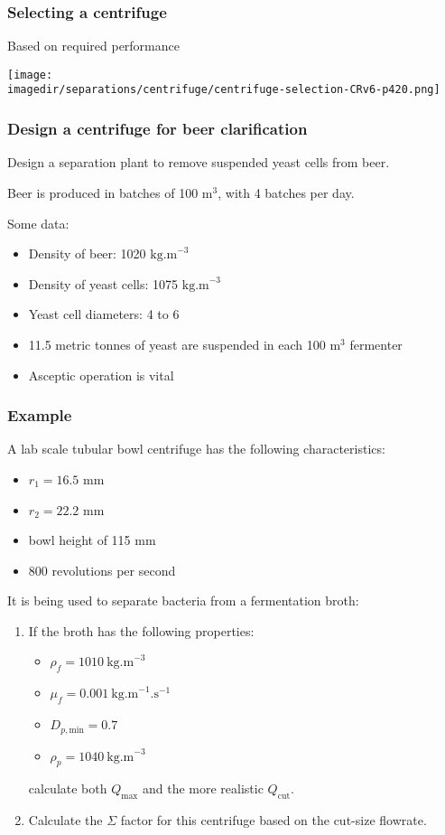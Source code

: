 \begin{frame}\frametitle{Selecting a centrifuge}
	Based on required performance
	\begin{center}
		\texttt{[image: \\imagedir/separations/centrifuge/centrifuge-selection-CRv6-p420.png]}
	\end{center}
\end{frame}

\begin{frame}\frametitle{Design a centrifuge for beer clarification}
	Design a separation plant to remove suspended yeast cells from beer.
	
	\vspace{12pt}
	Beer is produced in batches of 100 $\text{m}^3$, with 4 batches per day.
	
	\vspace{12pt}
	Some data:
	\begin{itemize}
		\item	Density of beer: 1020 $\text{kg.m}^{-3}$
		\item	Density of yeast cells: 1075 $\text{kg.m}^{-3}$
		\item	Yeast cell diameters: 4 to 6 \micron
		\item	11.5 metric tonnes of yeast are suspended in each 100 $\text{m}^3$ fermenter
		\item	Asceptic operation is vital		
	\end{itemize} 
\end{frame}

\begin{frame}\frametitle{Example}
	A lab scale tubular bowl centrifuge has the following characteristics:	
	\begin{itemize}
		\item	$r_1 = 16.5$ mm
		\item	$r_2 = 22.2$ mm
		\item	bowl height of 115 mm
		\item	800 revolutions per second
	\end{itemize}
	
	It is being used to separate bacteria from a fermentation broth:
	\begin{enumerate}		
		\item	If the broth has the following properties:
			\begin{itemize}
				\item	$\rho_f = 1010~\text{kg.m}^{-3}$
				\item	$\mu_f = 0.001~\text{kg.m}^{-1}\text{.s}^{-1}$
				\item	$D_{p,\text{min}} = 0.7$ \micron
				\item	$\rho_p = 1040~\text{kg.m}^{-3}$
			\end{itemize}
			calculate both $Q_\text{max}$ and the more realistic $Q_\text{cut}$.
		\item	Calculate the $\Sigma$ factor for this centrifuge based on the cut-size flowrate.
	\end{enumerate}
\end{frame}

